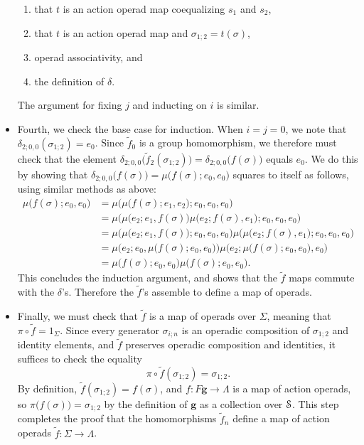 \begin{example}
\begin{itemize}
\begin{enumerate}
\item that $t$ is an action operad map coequalizing $s_1$ and $s_2$,
\item that $t$ is an action operad map and $\sigma_{1;2} = t(\sigma)$,
\item operad associativity, and
\item the definition of $\delta$.
\end{enumerate}
The argument for fixing $j$ and inducting on $i$ is similar.
\item Fourth, we check the base case for induction. When $i=j=0$, we note that $\delta_{2;0,0}(\sigma_{1;2}) = e_0$. 
Since $\tilde{f}_0$ is a group homomorphism, we therefore must check that the element
$\delta_{2;0,0}\big( \tilde{f}_2(\sigma_{1;2}) \big) = \delta_{2;0,0}\big( f(\sigma) \big)$
equals $e_0$. We do this by showing that $ \delta_{2;0,0}\big( f(\sigma) \big) = \mu\big(f(\sigma); e_0, e_0 \big)$ squares to itself as follows, using similar methods as above:
\begin{align*}
\mu\big(f(\sigma); e_0, e_0 \big) & = \mu\Big(\mu \big( f(\sigma);e_1, e_2\big); e_0, e_0, e_0 \Big) \\
& = \mu\Big(\mu \big(e_2;e_1, f(\sigma)\big)\mu \big(e_2; f(\sigma), e_1 \big); e_0, e_0, e_0 \Big) \\
& = \mu\Big(\mu \big(e_2;e_1, f(\sigma)\big); e_0, e_0, e_0 \Big)\mu\Big(\mu \big(e_2; f(\sigma), e_1 \big); e_0, e_0, e_0 \Big) \\
& = \mu\Big(e_2; e_0, \mu\big(f(\sigma); e_0,e_0\big) \Big)\mu\Big(e_2; \mu\big(f(\sigma); e_0,e_0\big),e_0 \Big) \\
& = \mu\big(f(\sigma); e_0,e_0\big)\mu\big(f(\sigma); e_0,e_0\big).
\end{align*}
This concludes the induction argument, and shows that the $\tilde{f}$ maps commute with the $\delta$'s. Therefore the $\tilde{f}$'s assemble to define a map of operads.
\item Finally, we must check that $\tilde{f}$ is a map of operads over $\Sigma$, meaning that $\pi \circ \tilde{f} = 1_{\Sigma}$.
Since every generator $\sigma_{i;n}$ is an operadic composition of $\sigma_{1;2}$ and identity elements, and $\tilde{f}$ preserves operadic composition and identities, it suffices to check the equality
\[
\pi \circ \tilde{f}(\sigma_{1;2}) = \sigma_{1;2}.
\]
By definition, $\tilde{f}(\sigma_{1;2}) = f(\sigma)$, and $f \colon F\mathbf{g} \to \Lambda$ is a map of action operads, so $\pi\big( f(\sigma) \big) = \sigma_{1;2}$ by the definition of $\mathbf{g}$ as a  collection over $\mathcal{S}$. This step completes the proof that the homomorphisms $\tilde{f}_n$ define a map of action operads $\tilde{f} \colon \Sigma \to \Lambda$.
\end{itemize}
\end{example}

